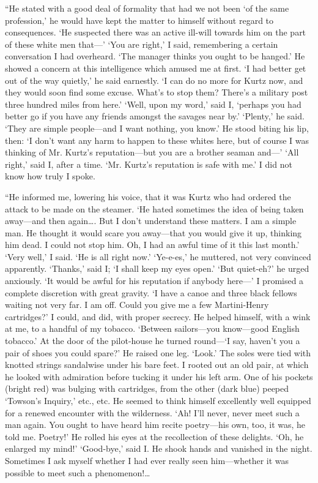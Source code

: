 \documentclass[12pt]{report}
\begin{document}
``He stated with a good deal of formality that had we not been `of the
same profession,' he would have kept the matter to himself without
regard to consequences. `He suspected there was an active ill-will
towards him on the part of these white men that---' `You are right,' I
said, remembering a certain conversation I had overheard. `The manager
thinks you ought to be hanged.' He showed a concern at this intelligence
which amused me at first. `I had better get out of the way quietly,' he
said earnestly. `I can do no more for Kurtz now, and they would soon
find some excuse. What's to stop them? There's a military post three
hundred miles from here.' `Well, upon my word,' said I, `perhaps you had
better go if you have any friends amongst the savages near by.'
`Plenty,' he said. `They are simple people---and I want nothing, you
know.' He stood biting his lip, then: `I don't want any harm to happen
to these whites here, but of course I was thinking of Mr. Kurtz's
reputation---but you are a brother seaman and---' `All right,' said I,
after a time. `Mr. Kurtz's reputation is safe with me.' I did not know
how truly I spoke.

``He informed me, lowering his voice, that it was Kurtz who had ordered
the attack to be made on the steamer. `He hated sometimes the idea of
being taken away---and then again\ldots{}. But I don't understand these
matters. I am a simple man. He thought it would scare you away---that
you would give it up, thinking him dead. I could not stop him. Oh, I had
an awful time of it this last month.' `Very well,' I said. `He is all
right now.' `Ye-e-es,' he muttered, not very convinced apparently.
`Thanks,' said I; `I shall keep my eyes open.' `But quiet-eh?' he urged
anxiously. `It would be awful for his reputation if anybody here---' I
promised a complete discretion with great gravity. `I have a canoe and
three black fellows waiting not very far. I am off. Could you give me a
few Martini-Henry cartridges?' I could, and did, with proper secrecy. He
helped himself, with a wink at me, to a handful of my tobacco. `Between
sailors---you know---good English tobacco.' At the door of the
pilot-house he turned round---`I say, haven't you a pair of shoes you
could spare?' He raised one leg. `Look.' The soles were tied with
knotted strings sandalwise under his bare feet. I rooted out an old
pair, at which he looked with admiration before tucking it under his
left arm. One of his pockets (bright red) was bulging with cartridges,
from the other (dark blue) peeped `Towson's Inquiry,' etc., etc. He
seemed to think himself excellently well equipped for a renewed
encounter with the wilderness. `Ah! I'll never, never meet such a man
again. You ought to have heard him recite poetry---his own, too, it was,
he told me. Poetry!' He rolled his eyes at the recollection of these
delights. `Oh, he enlarged my mind!' `Good-bye,' said I. He shook hands
and vanished in the night. Sometimes I ask myself whether I had ever
really seen him---whether it was possible to meet such a
phenomenon!\ldots{}
\end{document}
